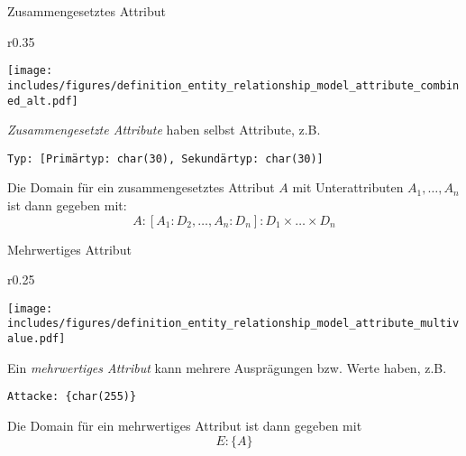 \begin{defi}{Zusammengesetztes Attribut}
    \begin{wrapfigure}{r}{0.35\textwidth}
        \begin{center}
            \texttt{[image: includes/figures/definition\_entity\_relationship\_model\_attribute\_combined\_alt.pdf]}
        \end{center}
    \end{wrapfigure}
    \emph{Zusammengesetzte Attribute} haben selbst Attribute, z.B.
    \begin{center}
        \texttt{Typ: [Primärtyp: char(30), Sekundärtyp: char(30)]}
    \end{center}

    Die Domain für ein zusammengesetztes Attribut $A$ mit Unterattributen $A_1, \ldots, A_n$ ist dann gegeben mit:
    \[
        A: [A_1 : D_2, \ldots, A_n:D_n]: D_1 \times \ldots \times D_n
    \]

    \vspace{3em}
\end{defi}

\begin{defi}{Mehrwertiges Attribut}
    \begin{wrapfigure}{r}{0.25\textwidth}
        \begin{center}
            \texttt{[image: includes/figures/definition\_entity\_relationship\_model\_attribute\_multivalue.pdf]}
        \end{center}
    \end{wrapfigure}
    Ein \emph{mehrwertiges Attribut} kann mehrere Ausprägungen bzw. Werte haben, z.B.
    \begin{center}
        \texttt{Attacke: \{char(255)\}}
    \end{center}

    Die Domain für ein mehrwertiges Attribut ist dann gegeben mit
    \[
        E : \{A\}
    \]
\end{defi}

